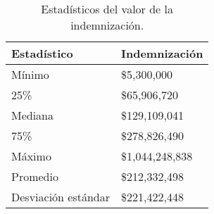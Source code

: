 \begin{table}[!htbp]
\centering
\caption{Estadísticos del valor de la indemnización.} 
\label{tab:indemnizacion}
\begin{tabular}{ll}
  \hline
Estadístico & Indemnización \\ 
  \hline
Mínimo & \$5,300,000 \\ 
  25\% & \$65,906,720 \\ 
  Mediana & \$129,109,041 \\ 
  75\% & \$278,826,490 \\ 
  Máximo & \$1,044,248,838 \\ 
  Promedio & \$212,332,498 \\ 
  Desviación estándar & \$221,422,448 \\ 
   \hline
\end{tabular}
\end{table}
